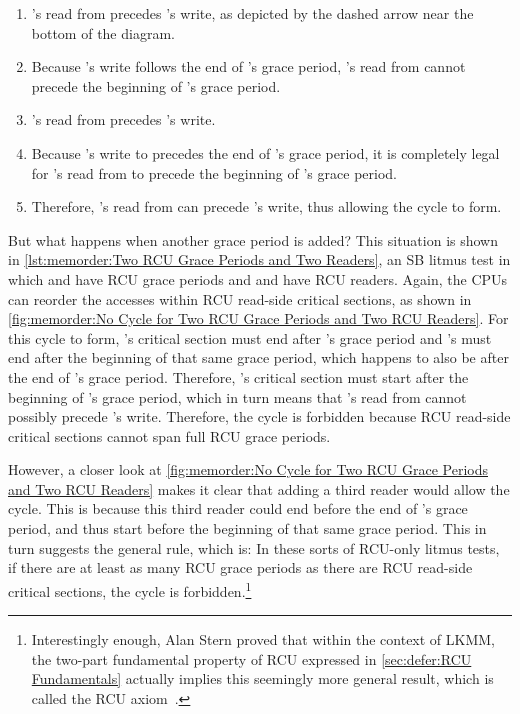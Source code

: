 \begin{enumerate}
\item	{}'s read from  precedes 's write, as
	depicted by the dashed arrow near the bottom of the diagram.
\item	Because 's write follows the end of 's grace period,
	's read from  cannot precede the beginning of
	's grace period.
\item	{}'s read from  precedes 's write.
\item	Because 's write to  precedes the end of
	's grace period, it is completely legal for 's
	read from  to precede the beginning of 's grace period.
\item	Therefore, 's read from  can precede 's
	write, thus allowing the cycle to form.
\end{enumerate}

But what happens when another grace period is added?
This situation is shown in
\cref{lst:memorder:Two RCU Grace Periods and Two Readers},
an SB litmus test in which  and  have RCU grace periods
and  and  have RCU readers.
Again, the CPUs can reorder the accesses within RCU read-side critical
sections, as shown in
\cref{fig:memorder:No Cycle for Two RCU Grace Periods and Two RCU Readers}.
For this cycle to form, 's critical section must
end after 's grace period and 's must end after the
beginning of that same grace period, which happens to also be after the
end of 's grace period.
Therefore, 's critical section must start after the beginning
of 's grace period, which in turn means that 's
read from  cannot possibly precede 's write.
Therefore, the cycle is forbidden because RCU read-side critical sections
cannot span full RCU grace periods.

However, a closer look at
\cref{fig:memorder:No Cycle for Two RCU Grace Periods and Two RCU Readers}
makes it clear that adding a third reader would allow the cycle.
This is because this third reader could end before the end of 's
grace period, and thus start before the beginning of that same grace
period.
This in turn suggests the general rule, which is:  In these sorts of RCU-only
litmus tests, if there are at least as many RCU grace periods as there
are RCU read-side critical sections, the cycle is forbidden.\footnote{
	Interestingly enough, Alan Stern proved that within the context
	of LKMM, the two-part fundamental property of RCU expressed
	in \cref{sec:defer:RCU Fundamentals} actually implies
	this seemingly more general result, which is called the RCU
	axiom~\cite{Alglave:2018:FSC:3173162.3177156}.}

